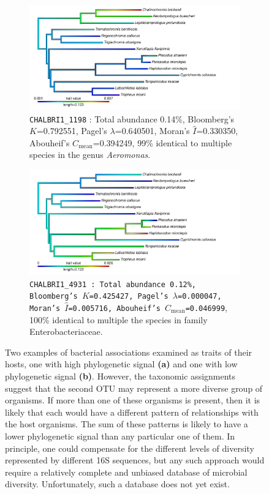 
\begin{figure}
    \centering
    \begin{subfigure}[t]{\fishfigwidth}
        \includegraphics[width=\fishfigwidth]{FishPoo/figures/phylosig_heattree_highsig}
        \small
        \caption{{\tt CHALBRI1_1198} : Total abundance 0.14\%, Bloomberg's $K$=0.792551, Pagel's $\lambda$=0.640501, Moran's $\hat{I}$=0.330350, Abouheif's $C_{\mathrm{mean}}$=0.394249, 99\% identical to multiple species in the genus {\em Aeromonas}.}
    \end{subfigure}
    \begin{subfigure}[t]{\fishfigwidth}
        \includegraphics[width=\fishfigwidth]{FishPoo/figures/phylosig_heattree_lowsig}
        \small
        \caption{{\tt CHALBRI1_4931 : Total abundance 0.12\%, Bloomberg's $K$=0.425427, Pagel's $\lambda$=0.000047, Moran's $\hat{I}$=0.005716, Abouheif's $C_{\mathrm{mean}}$=0.046999}, 100\% identical to multiple the species in family Enterobacteriaceae.}
    \end{subfigure}
    \caption{Two examples of bacterial associations examined as traits of their hosts, one with high phylogenetic signal \textbf{(a)} and one with low phylogenetic signal \textbf{(b)}. However, the taxonomic assignments suggest that the second OTU may represent a more diverse group of organisms. If more than one of these organisms is present, then it is likely that each would have a different pattern of relationships with the host organisms. The sum of these patterns is likely to have a lower phylogenetic signal than any particular one of them. In principle, one could compensate for the different levels of diversity represented by different 16S sequences, but any such approach would require a relatively complete and unbiased database of microbial diversity. Unfortunately, such a database does not yet exist.}
    \label{fig:my_label}
\end{figure}
